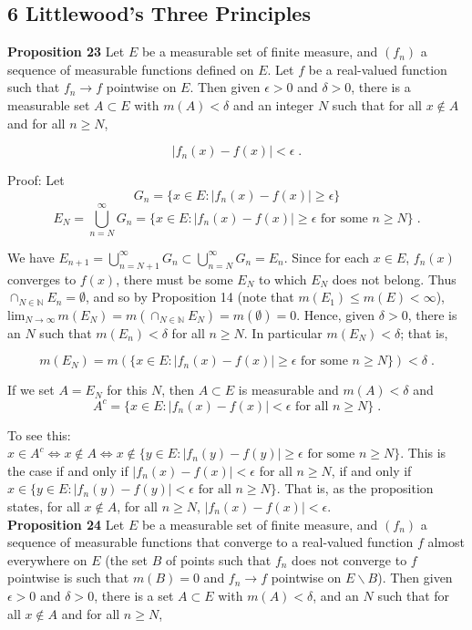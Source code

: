 \documentclass[a4paper]{article}
\begin{document}
\subsection*{6 Littlewood's Three Principles}

{\bf Proposition 23} Let $E$ be a measurable set of finite measure, and $(f_n)$ a sequence of measurable functions defined on $E$. Let $f$ be a real-valued function such that $f_n \rightarrow f$ pointwise on $E$. Then given $\epsilon > 0$ and $\delta >0$, there is a measurable set $A \subset E$ with $m(A) < \delta$ and an integer $N$ such that for all $x \not\in A$ and for all $n \geq N$, 

$$|f_n(x) - f(x)| < \epsilon \;.$$

Proof: Let 
$$G_n = \{x \in E : |f_n(x) - f(x)| \geq \epsilon\}$$
$$E_N = \bigcup_{n=N}^\infty G_n = \{x \in E : |f_n(x) - f(x) | \geq \epsilon \text{ for some } n\geq N\} \;.$$

We have $E_{n+1} = \bigcup_{n=N+1}^\infty G_n \subset \bigcup_{n = N}^\infty G_n =  E_n$. Since for each $x \in E$, $f_n(x)$ converges to $f(x)$, there must be some $E_N$ to which $E_N$ does not belong. Thus $\cap_{N \in \mathbb{N}} E_n = \emptyset$, and so by Proposition 14 (note that $m(E_1)\leq m(E) < \infty$), $\text{lim}_{N\rightarrow\infty} \, m(E_N) = m\left(\cap_{N \in \mathbb{N}} E_N \right) = m(\emptyset) = 0$. Hence, given $\delta > 0$, there is an $N$ such that $m(E_n) < \delta$ for all $n\geq N$. In particular $m(E_N) < \delta$; that is,

$$m(E_N) = m(\{x \in E : |f_n(x) - f(x)| \geq \epsilon  \text{ for some } n \geq N\}) < \delta \;.$$

If we set $A = E_N$ for this $N$, then $A \subset E$ is measurable and $m(A) < \delta$ and $$A^c = \{x \in E : |f_n(x) - f(x)| < \epsilon \text{ for all } n \geq N\} \;.$$

To see this:  $x \in A^c \iff x \not\in A \iff x \not\in \{y \in E : |f_n(y) - f(y)| \geq \epsilon \text{ for some } n \geq N\}$. This is the case if and only if $|f_n(x) - f(x)| < \epsilon$ for all $n \geq N$, if and only if $x \in \{y \in E : |f_n(y) - f(y)| <\epsilon \text{ for all } n \geq N\}$. That is, as the proposition states, for all $x \not\in A$, for all $n\geq N$, $|f_n(x) - f(x)| < \epsilon$. \\

{\bf Proposition 24} Let $E$ be a measurable set of finite measure, and $(f_n)$ a sequence of measurable functions that converge to a real-valued function $f$ almost everywhere on $E$ (the set $B$ of points such that $f_n$ does not converge to $f$ pointwise is such that $m(B) = 0$ and $f_n \rightarrow f$ pointwise on $E \backslash B$). Then given $\epsilon > 0$ and $\delta > 0$, there is a set $A \subset E$ with $m(A) < \delta$, and an $N$ such that for all $x\not\in A$ and for all $n\geq N$, 
\end{document}
